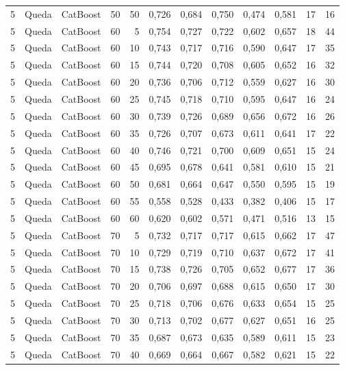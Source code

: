 \begin{longtable}{@{}rllrrrrrrrrr@{}}
5 & Queda & CatBoost & 50 & 50 & 0,726 & 0,684 & 0,750 & 0,474 & 0,581 & 17 & 16 \\
5 & Queda & CatBoost & 60 & 5 & 0,754 & 0,727 & 0,722 & 0,602 & 0,657 & 18 & 44 \\
5 & Queda & CatBoost & 60 & 10 & 0,743 & 0,717 & 0,716 & 0,590 & 0,647 & 17 & 35 \\
5 & Queda & CatBoost & 60 & 15 & 0,744 & 0,720 & 0,708 & 0,605 & 0,652 & 16 & 32 \\
5 & Queda & CatBoost & 60 & 20 & 0,736 & 0,706 & 0,712 & 0,559 & 0,627 & 16 & 30 \\
5 & Queda & CatBoost & 60 & 25 & 0,745 & 0,718 & 0,710 & 0,595 & 0,647 & 16 & 24 \\
5 & Queda & CatBoost & 60 & 30 & 0,739 & 0,726 & 0,689 & 0,656 & 0,672 & 16 & 26 \\
5 & Queda & CatBoost & 60 & 35 & 0,726 & 0,707 & 0,673 & 0,611 & 0,641 & 17 & 22 \\
5 & Queda & CatBoost & 60 & 40 & 0,746 & 0,721 & 0,700 & 0,609 & 0,651 & 15 & 24 \\
5 & Queda & CatBoost & 60 & 45 & 0,695 & 0,678 & 0,641 & 0,581 & 0,610 & 15 & 21 \\
5 & Queda & CatBoost & 60 & 50 & 0,681 & 0,664 & 0,647 & 0,550 & 0,595 & 15 & 19 \\
5 & Queda & CatBoost & 60 & 55 & 0,558 & 0,528 & 0,433 & 0,382 & 0,406 & 15 & 17 \\
5 & Queda & CatBoost & 60 & 60 & 0,620 & 0,602 & 0,571 & 0,471 & 0,516 & 13 & 15 \\
5 & Queda & CatBoost & 70 & 5 & 0,732 & 0,717 & 0,717 & 0,615 & 0,662 & 17 & 47 \\
5 & Queda & CatBoost & 70 & 10 & 0,729 & 0,719 & 0,710 & 0,637 & 0,672 & 17 & 41 \\
5 & Queda & CatBoost & 70 & 15 & 0,738 & 0,726 & 0,705 & 0,652 & 0,677 & 17 & 36 \\
5 & Queda & CatBoost & 70 & 20 & 0,706 & 0,697 & 0,688 & 0,615 & 0,650 & 17 & 30 \\
5 & Queda & CatBoost & 70 & 25 & 0,718 & 0,706 & 0,676 & 0,633 & 0,654 & 15 & 25 \\
5 & Queda & CatBoost & 70 & 30 & 0,713 & 0,702 & 0,677 & 0,627 & 0,651 & 16 & 25 \\
5 & Queda & CatBoost & 70 & 35 & 0,687 & 0,673 & 0,635 & 0,589 & 0,611 & 15 & 23 \\
5 & Queda & CatBoost & 70 & 40 & 0,669 & 0,664 & 0,667 & 0,582 & 0,621 & 15 & 22 \\

\end{longtable}
